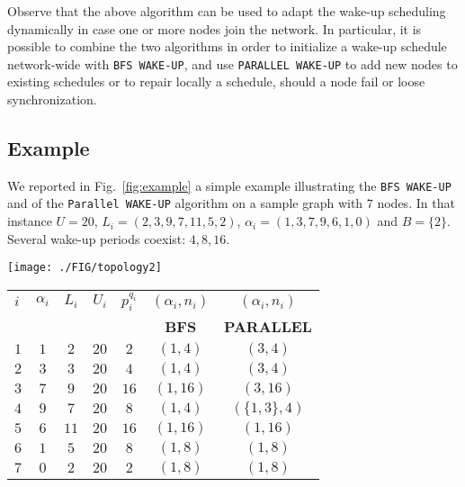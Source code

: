 \begin{rem}
Observe that the above algorithm can be used to adapt the wake-up scheduling dynamically in case one or more nodes 
join the network. In particular, it is possible to combine the two algorithms in order to initialize a 
wake-up schedule network-wide with {\tt BFS WAKE-UP}, and use {\tt PARALLEL WAKE-UP} to add new nodes to existing schedules
 or to repair locally a schedule, should a node fail or loose synchronization.
\end{rem}


\subsection{Example}


We reported in Fig.~\ref{fig:example} a simple example 
illustrating the {\tt BFS WAKE-UP} and of the {\tt Parallel WAKE-UP} 
algorithm on a sample graph with $7$ 
nodes. In that instance $U=20$, $L_i=(2,3,9,7,11,5,2)$, 
$\alpha_i=(1,3,7,9,6,1,0)$ and $B=\{2\}$. Several 
wake-up periods coexist: $4,8,16$.

\begin{figure*}[t]
\centering
\begin{minipage}{4cm}
\texttt{[image: ./FIG/topology2]}
\end{minipage}
\begin{minipage}{4cm}{\begin{tabular}{|l|c|c|c|c|c|c|}
\hline
\textbf{$i$ } & \textbf{$\alpha_i$} & \textbf{$L_i$}& \textbf{$U_i$}& \textbf{$p_i^{q_i}$}&\textbf{$(\alpha_i,n_i)$}& \textbf{$(\alpha_i,n_i)$}\\
&  &   & &  &\textbf{BFS} & \textbf{PARALLEL}\\
\hline
\hline
$1$ & $1$ &$2$ &$20$ &$2$  & $(1,4)$ & $(3,4)$\\
$2$ & $3$ &$3$ &$20$ &$4$  & $(1,4)$ & $(3,4)$\\
$3$ & $7$  &$9$ &$20$ &$16$ & $(1,16)$ & $(3,16)$\\
$4$ & $9$ &$7$ &$20$ & $8$  & $(1,4)$ & $(\{1,3\},4)$\\
$5$ & $6$  &$11$ &$20$ & $16$ & $(1,16)$ & $(1,16)$\\
$6$ & $1$  &$5$ &$20$ &$8$  & $(1,8)$ & $(1,8)$\\
$7$ & $0$  &$2$ &$20$ &$2$  & $(1,8)$ & $(1,8)$\\
\hline
\end{tabular}
}\end{minipage}
\caption{Example. {\tt BFS WAKE-UP} and {\tt PARALLEL WAKE-UP} on a sample topology. The table reports on the final output of the algorithms.}\label{fig:example}
\end{figure*}

